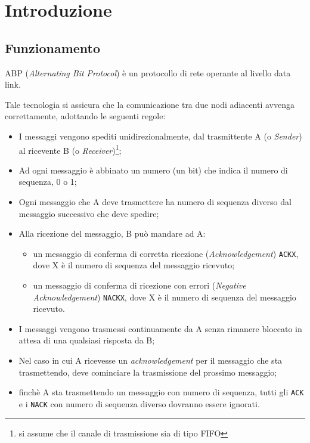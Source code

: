 \section{Introduzione}

\subsection{Funzionamento}\label{sec:intro-abstract}
ABP (\emph{Alternating Bit Protocol}) è un protocollo di rete operante al
livello data link.

Tale tecnologia si assicura che la comunicazione tra due nodi adiacenti avvenga
correttamente, adottando le seguenti regole:

\begin{itemize}
  \item I messaggi vengono spediti unidirezionalmente, dal
    trasmittente A (o \emph{Sender}) al ricevente B (o
    \emph{Receiver})\footnote{si assume che il canale di trasmissione sia di
    tipo FIFO};
  \item Ad ogni messaggio è abbinato un numero (un bit) che indica il numero di
    sequenza, 0 o 1;
  \item Ogni messaggio che A deve trasmettere ha numero di sequenza diverso dal
    messaggio successivo che deve spedire;
  \item Alla ricezione del messaggio, B può mandare ad A:
  \begin{itemize}
    \item un messaggio di conferma di corretta ricezione
      (\emph{Acknowledgement}) \texttt{ACKX}, dove X è il numero di sequenza
      del messaggio ricevuto;
    \item un messaggio di conferma di ricezione con errori
      (\emph{Negative Acknowledgement}) \texttt{NACKX}, dove X è il numero di
      sequenza del messaggio ricevuto.
  \end{itemize}
  \item I messaggi vengono trasmessi continuamente da A senza rimanere
    bloccato in attesa di una qualsiasi risposta da B;
  \item Nel caso in cui A ricevesse un \emph{acknowledgement} per il messaggio
    che sta trasmettendo, deve cominciare la trasmissione del prossimo
    messaggio;
  \item finchè A sta trasmettendo un messaggio con numero di sequenza, tutti
    gli \texttt{ACK} e i \texttt{NACK} con numero di sequenza diverso dovranno
    essere ignorati.
\end{itemize}
